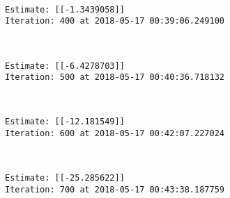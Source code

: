 \documentclass[11pt]{article}
\begin{document}
    \begin{center}
    \end{center}
    { \hspace*{\fill} \\}
    
    \begin{Verbatim}[commandchars=\\\{\}]
Estimate: [[-1.3439058]]
Iteration: 400 at 2018-05-17 00:39:06.249100

    \end{Verbatim}

    \begin{center}
    \end{center}
    { \hspace*{\fill} \\}
    
    \begin{Verbatim}[commandchars=\\\{\}]
Estimate: [[-6.4278703]]
Iteration: 500 at 2018-05-17 00:40:36.718132

    \end{Verbatim}

    \begin{center}
    \end{center}
    { \hspace*{\fill} \\}
    
    \begin{Verbatim}[commandchars=\\\{\}]
Estimate: [[-12.181549]]
Iteration: 600 at 2018-05-17 00:42:07.227024

    \end{Verbatim}

    \begin{center}
    \end{center}
    { \hspace*{\fill} \\}
    
    \begin{Verbatim}[commandchars=\\\{\}]
Estimate: [[-25.285622]]
Iteration: 700 at 2018-05-17 00:43:38.187759

    \end{Verbatim}
\end{document}
